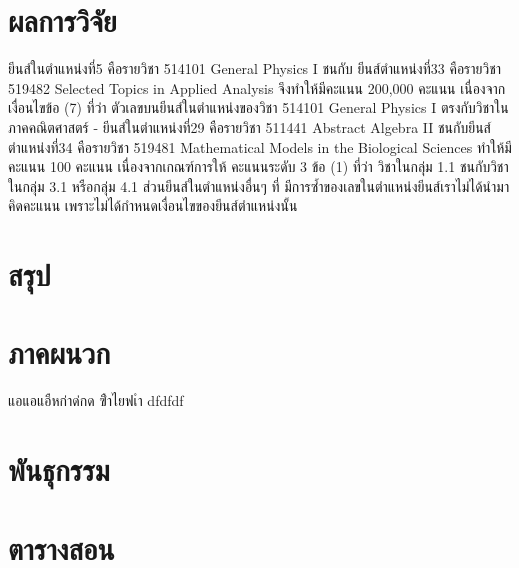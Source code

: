 \documentclass[a4paper,12pt,oneside]{book}
\begin{document}
\chapter{ผลการวิจัย}
ยีนส์ในตำแหน่งที่5 คือรายวิชา 514101 General Physics I ชนกับ ยีนส์ตำแหน่งที่33 คือรายวิชา 519482
Selected Topics in Applied Analysis จึงทำให้มีคะแนน 200,000 คะแนน เนื่องจากเงื่อนไขข้อ (7) ที่ว่า
ตัวเลขบนยีนส์ในตำแหน่งของวิชา 514101 General Physics I ตรงกับวิชาในภาคคณิตศาสตร์
- ยีนส์ในตำแหน่งที่29 คือรายวิชา 511441 Abstract Algebra II ชนกับยีนส์ตำแหน่งที่34 คือรายวิชา 519481
Mathematical Models in the Biological Sciences ทำให้มีคะแนน 100 คะแนน เนื่องจากเกณฑ์การให้
คะแนนระดับ 3 ข้อ (1) ที่ว่า วิชาในกลุ่ม 1.1 ชนกับวิชาในกลุ่ม 3.1 หรือกลุ่ม 4.1 ส่วนยีนส์ในตำแหน่งอื่นๆ ที่
มีการซ้ำของเลขในตำแหน่งยีนส์เราไม่ได้นำมาคิดคะแนน เพราะไม่ได้กำหนดเงื่อนไขของยีนส์ตำแหน่งนั้น
\chapter{สรุป}

\clearpage

\appendix
\chapter{ภาคผนวก}

	แอแอแอืหก่าด่กด
	ฃืำไยฟเำ
	\newpage
	dfdfdf
\chapter{พันธุกรรม}
\chapter{ตารางสอน}
\end{document}
